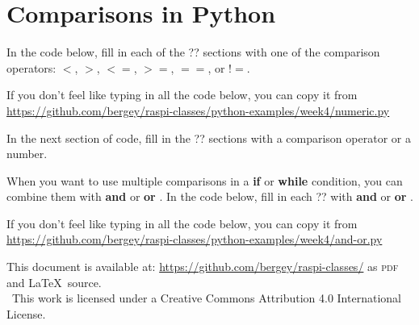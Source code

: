 \documentclass{article}
\newcommand\And{\textbf{and} }
\newcommand\Or{\textbf{or} }
\begin{document}
\section*{Comparisons in Python}

In the code below, fill in each of the ?? sections with one of the comparison operators:   $<$, $>$, $<=$, $>=$, $==$, or $!=$.

If you don't feel like typing in all the code below, you can copy it from \url{https://github.com/bergey/raspi-classes/python-examples/week4/numeric.py}



In the next section of code, fill in the ?? sections with a comparison operator or a number.



When you want to use multiple comparisons in a \textbf{if} or \textbf{while} condition, you can combine them with \And or \Or.  In the code below, fill in each ?? with \And or \Or.

If you don't feel like typing in all the code below, you can copy it from \url{https://github.com/bergey/raspi-classes/python-examples/week4/and-or.py}



This document is available at: \url{https://github.com/bergey/raspi-classes/} as \textsc{pdf} and \LaTeX\ source.\\
\ccby \ This work is licensed under a Creative Commons Attribution 4.0 International License.
\end{document}
